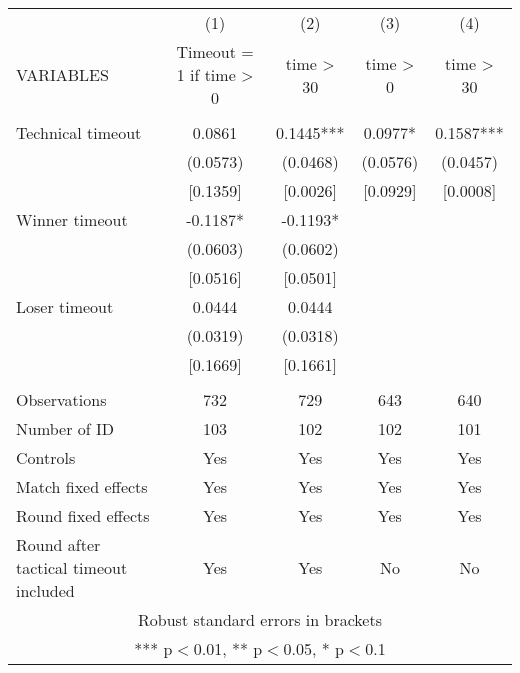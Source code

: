 \documentclass[]{article}
\begin{document}
\begin{tabular}{lcccc} \hline
 & (1) & (2) & (3) & (4) \\
VARIABLES & Timeout = 1 if time > 0 & time > 30 & time > 0 & time > 30 \\ \hline
 &  &  &  &  \\
Technical timeout & 0.0861 & 0.1445*** & 0.0977* & 0.1587*** \\
 & (0.0573) & (0.0468) & (0.0576) & (0.0457) \\
 & [0.1359] & [0.0026] & [0.0929] & [0.0008] \\
Winner timeout & -0.1187* & -0.1193* &  &  \\
 & (0.0603) & (0.0602) &  &  \\
 & [0.0516] & [0.0501] &  &  \\
Loser timeout & 0.0444 & 0.0444 &  &  \\
 & (0.0319) & (0.0318) &  &  \\
 & [0.1669] & [0.1661] &  &  \\
 &  &  &  &  \\
Observations & 732 & 729 & 643 & 640 \\
Number of ID & 103 & 102 & 102 & 101 \\
Controls & Yes & Yes & Yes & Yes \\
Match fixed effects & Yes & Yes & Yes & Yes \\
Round fixed effects & Yes & Yes & Yes & Yes \\
 Round after tactical timeout included & Yes & Yes & No & No \\ \hline
\multicolumn{5}{c}{ Robust standard errors in brackets} \\
\multicolumn{5}{c}{ *** p$<$0.01, ** p$<$0.05, * p$<$0.1} \\
\end{tabular}
\end{document}
